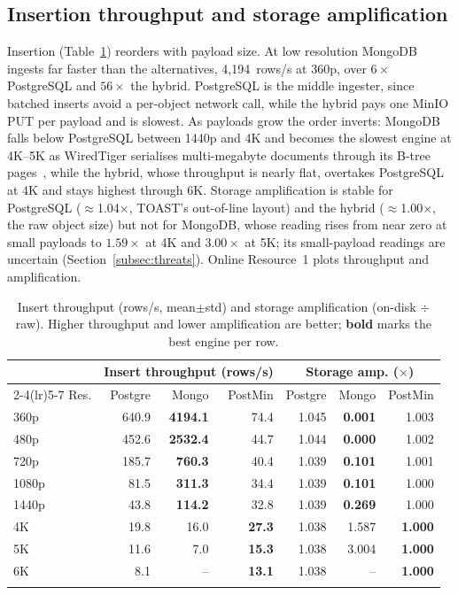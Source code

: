 \documentclass[pdflatex,sn-basic]{sn-jnl}%
\begin{document}
\subsection{Insertion throughput and storage amplification}\label{subsec:insert}
Insertion (Table~\ref{tab:write}) reorders with payload size. At low resolution MongoDB ingests far faster than the alternatives, 4{,}194~rows/s at 360p, over $6\times$ PostgreSQL and $56\times$ the hybrid. PostgreSQL is the middle ingester, since batched inserts avoid a per-object network call, while the hybrid pays one MinIO PUT per payload and is slowest. As payloads grow the order inverts: MongoDB falls below PostgreSQL between 1440p and 4K and becomes the slowest engine at 4K--5K as WiredTiger serialises multi-megabyte documents through its B-tree pages~\citep{wiredtiger_btree_architecture}, while the hybrid, whose throughput is nearly flat, overtakes PostgreSQL at 4K and stays highest through 6K. Storage amplification is stable for PostgreSQL ($\approx$1.04$\times$, TOAST's out-of-line layout) and the hybrid ($\approx$1.00$\times$, the raw object size) but not for MongoDB, whose reading rises from near zero at small payloads to $1.59\times$ at 4K and $3.00\times$ at 5K; its small-payload readings are uncertain (Section~\ref{subsec:threats}). Online Resource~1 plots throughput and amplification.

\begin{table}[htbp]
\caption{Insert throughput (rows/s, mean$\pm$std) and storage amplification (on-disk $\div$ raw). Higher throughput and lower amplification are better; \textbf{bold} marks the best engine per row.}\label{tab:write}
\small
\setlength{\tabcolsep}{4pt}
\begin{tabular}{@{}lrrrrrr@{}}
\toprule
 & \multicolumn{3}{c}{Insert throughput (rows/s)} & \multicolumn{3}{c}{Storage amp. ($\times$)} \\
\cmidrule(lr){2-4}\cmidrule(lr){5-7}
Res. & Postgre & Mongo & PostMin & Postgre & Mongo & PostMin \\
\midrule
360p  & 640.9          & \textbf{4194.1} & 74.4          & 1.045 & \textbf{0.001} & 1.003 \\
480p  & 452.6          & \textbf{2532.4} & 44.7          & 1.044 & \textbf{0.000} & 1.002 \\
720p  & 185.7          & \textbf{760.3}  & 40.4          & 1.039 & \textbf{0.101} & 1.001 \\
1080p & 81.5           & \textbf{311.3}  & 34.4          & 1.039 & \textbf{0.101} & 1.000 \\
1440p & 43.8           & \textbf{114.2}  & 32.8          & 1.039 & \textbf{0.269} & 1.000 \\
4K    & 19.8           & 16.0            & \textbf{27.3} & 1.038 & 1.587 & \textbf{1.000} \\
5K    & 11.6           & 7.0             & \textbf{15.3} & 1.038 & 3.004 & \textbf{1.000} \\
6K    & 8.1            & --              & \textbf{13.1} & 1.038 & --    & \textbf{1.000} \\
\botrule
\end{tabular}
\end{table}
\end{document}
